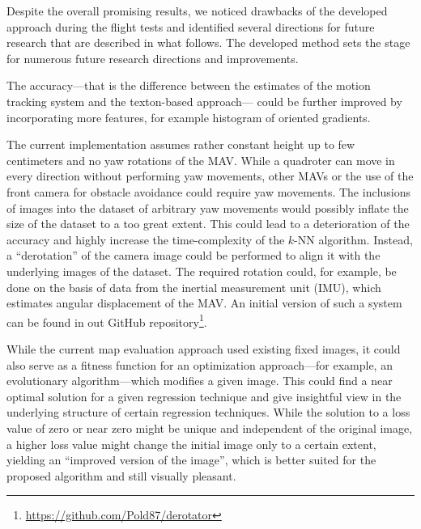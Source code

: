 \documentclass[11pt]{report}
\begin{document}
Despite the overall promising results, we noticed drawbacks of the
developed approach during the flight tests and identified several
directions for future research that are described in what follows. The
developed method sets the stage for numerous future research
directions and improvements.

The accuracy---that is the difference between the estimates of the
motion tracking system and the texton-based approach--- could be
further improved by incorporating more features, for example histogram
of oriented gradients.

The current implementation assumes rather constant height up to few
centimeters and no yaw rotations of the MAV. While a quadroter can
move in every direction without performing yaw movements, other MAVs
or the use of the front camera for obstacle avoidance could require
yaw movements. The inclusions of images into the dataset of arbitrary
yaw movements would possibly inflate the size of the dataset to a too
great extent. This could lead to a deterioration of the accuracy and
highly increase the time-complexity of the $k$-NN algorithm. Instead,
a ``derotation'' of the camera image could be performed to align it
with the underlying images of the dataset. The required rotation
could, for example, be done on the basis of data from the inertial
measurement unit (IMU), which estimates angular displacement of the
MAV. An initial version of such a system can be found in out GitHub
repository\footnote{\url{https://github.com/Pold87/derotator}}.

While the current map evaluation approach used existing fixed images,
it could also serve as a fitness function for an optimization
approach---for example, an evolutionary algorithm---which modifies a
given image. This could find a near optimal solution for a given
regression technique and give insightful view in the underlying
structure of certain regression techniques. While the solution to a
loss value of zero or near zero might be unique and independent of the
original image, a higher loss value might change the initial image
only to a certain extent, yielding an ``improved version of the
image'', which is better suited for the proposed algorithm and still
visually pleasant.
\end{document}
